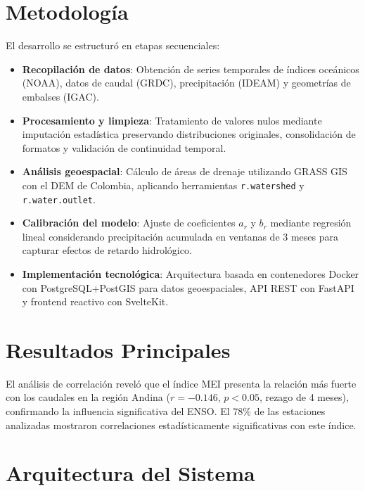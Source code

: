\section*{Metodología}

El desarrollo se estructuró en etapas secuenciales:

\begin{itemize}
    \item \textbf{Recopilación de datos}: Obtención de series temporales de índices oceánicos (NOAA), datos de caudal (GRDC), precipitación (IDEAM) y geometrías de embalses (IGAC).
    
    \item \textbf{Procesamiento y limpieza}: Tratamiento de valores nulos mediante imputación estadística preservando distribuciones originales, consolidación de formatos y validación de continuidad temporal.
    
    \item \textbf{Análisis geoespacial}: Cálculo de áreas de drenaje utilizando GRASS GIS con el DEM de Colombia, aplicando herramientas \texttt{r.watershed} y \texttt{r.water.outlet}.
    
    \item \textbf{Calibración del modelo}: Ajuste de coeficientes $a_r$ y $b_r$ mediante regresión lineal considerando precipitación acumulada en ventanas de 3 meses para capturar efectos de retardo hidrológico.
    
    \item \textbf{Implementación tecnológica}: Arquitectura basada en contenedores Docker con PostgreSQL+PostGIS para datos geoespaciales, API REST con FastAPI y frontend reactivo con SvelteKit.
\end{itemize}

\section*{Resultados Principales}

El análisis de correlación reveló que el índice MEI presenta la relación más fuerte con los caudales en la región Andina ($r = -0.146$, $p < 0.05$, rezago de 4 meses), confirmando la influencia significativa del ENSO. El 78\% de las estaciones analizadas mostraron correlaciones estadísticamente significativas con este índice.

\section*{Arquitectura del Sistema}

